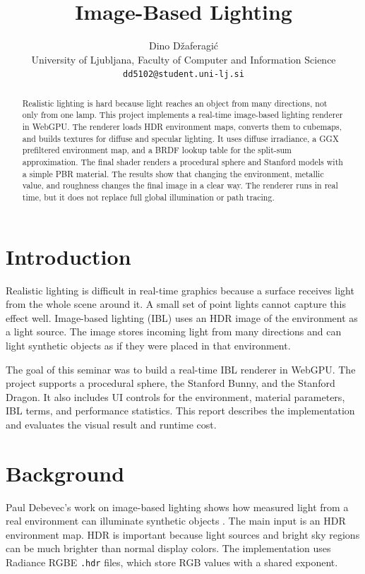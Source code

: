\documentclass{egpubl}
\title{Image-Based Lighting}
\author{Dino Džaferagić\\
University of Ljubljana, Faculty of Computer and Information Science\\
\texttt{dd5102@student.uni-lj.si}}
\begin{document}
\maketitle

\begin{abstract}
    Realistic lighting is hard because light reaches an object from many directions, not only from one lamp.
    This project implements a real-time image-based lighting renderer in WebGPU.
    The renderer loads HDR environment maps, converts them to cubemaps, and builds textures for diffuse and specular lighting.
    It uses diffuse irradiance, a GGX prefiltered environment map, and a BRDF lookup table for the split-sum approximation.
    The final shader renders a procedural sphere and Stanford models with a simple PBR material.
    The results show that changing the environment, metallic value, and roughness changes the final image in a clear way.
    The renderer runs in real time, but it does not replace full global illumination or path tracing.
\end{abstract}

\section{Introduction}

Realistic lighting is difficult in real-time graphics because a surface receives light from the whole scene around it.
A small set of point lights cannot capture this effect well.
Image-based lighting (IBL) uses an HDR image of the environment as a light source.
The image stores incoming light from many directions and can light synthetic objects as if they were placed in that environment.

The goal of this seminar was to build a real-time IBL renderer in WebGPU.
The project supports a procedural sphere, the Stanford Bunny, and the Stanford Dragon.
It also includes UI controls for the environment, material parameters, IBL terms, and performance statistics.
This report describes the implementation and evaluates the visual result and runtime cost.

\section{Background}

Paul Debevec's work on image-based lighting shows how measured light from a real environment can illuminate synthetic objects \cite{debevec2006ibl,debevec1999ibml}.
The main input is an HDR environment map.
HDR is important because light sources and bright sky regions can be much brighter than normal display colors.
The implementation uses Radiance RGBE \texttt{.hdr} files, which store RGB values with a shared exponent.
\end{document}
